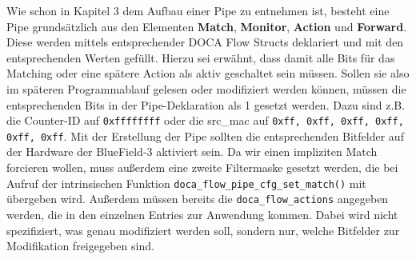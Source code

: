 Wie schon in Kapitel 3 dem Aufbau einer Pipe zu entnehmen ist, besteht eine Pipe grundsätzlich aus den Elementen \textbf{Match}, \textbf{Monitor}, \textbf{Action} und \textbf{Forward}. Diese werden mittels entsprechender DOCA Flow Structs deklariert und mit den entsprechenden Werten gefüllt. Hierzu sei erwähnt, dass damit alle Bits für das Matching oder eine spätere Action als aktiv geschaltet sein müssen. Sollen sie also im späteren Programmablauf gelesen oder modifiziert werden können, müssen die entsprechenden Bits in der Pipe-Deklaration als 1 gesetzt werden. Dazu sind z.B. die Counter-ID auf \texttt{0xffffffff} oder die src\_mac auf \texttt{0xff, 0xff, 0xff, 0xff, 0xff, 0xff}. Mit der Erstellung der Pipe sollten die entsprechenden Bitfelder auf der Hardware der BlueField-3 aktiviert sein. Da wir einen impliziten Match forcieren wollen, muss außerdem eine zweite Filtermaske gesetzt werden, die bei Aufruf der intrinsischen Funktion \texttt{doca\_flow\_pipe\_cfg\_set\_match()} mit übergeben wird. Außerdem müssen bereits die \texttt{doca\_flow\_actions} angegeben werden, die in den einzelnen Entries zur Anwendung kommen. Dabei wird nicht spezifiziert, was genau modifiziert werden soll, sondern nur, welche Bitfelder zur Modifikation freigegeben sind.

